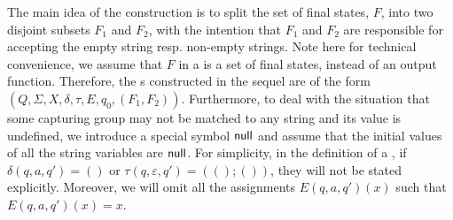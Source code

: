 


%  








The main idea of the construction is to split the set of final states, $F$, into two disjoint subsets $F_1$ and $F_2$, with the intention that $F_1$ and $F_2$ are responsible for accepting the empty string resp. non-empty strings. Note here for technical convenience, we assume that $F$ in a {\PSST} is a set of final states, instead of an output function. Therefore, the {\PSST}s constructed in the sequel are of the form $(Q, \Sigma, X, \delta, \tau, E, q_0, (F_1, F_2))$. 
%
Furthermore, to deal with the situation that some capturing group may not be matched to any string and its value is undefined, we introduce a special symbol $\mathsf{null}$ %
and assume that the initial values of all the string variables are $\mathsf{null}$. %
For simplicity, in the definition of a {\PSST}, if $\delta(q, a, q') = ()$ or $\tau(q, \varepsilon, q') = ((); ())$,  they will not be stated explicitly. Moreover, we will omit all the assignments $E(q, a, q')(x)$ such that $E(q, a, q')(x) = x$.

